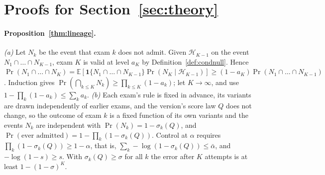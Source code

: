 \section{Proofs for Section~\ref{sec:theory}}\label{app:theory}

\paragraph{Proposition~\ref{thm:lineage}.}
\emph{(a)} Let $N_k$ be the event that exam $k$ does not admit. Given $\mathcal H_{K-1}$ on the event $N_1\cap\dots\cap N_{K-1}$, exam $K$ is valid at level $a_K$ by Definition~\ref{def:condnull}. Hence $\Pr(N_1\cap\dots\cap N_K)=\mathbb E[\mathbf 1\{N_1\cap\dots\cap N_{K-1}\}\Pr(N_K\mid\mathcal H_{K-1})]\ge(1-a_K)\Pr(N_1\cap\dots\cap N_{K-1})$. Induction gives $\Pr(\bigcap_{k\le K}N_k)\ge\prod_{k\le K}(1-a_k)$; let $K\to\infty$, and use $1-\prod_k(1-a_k)\le\sum_ka_k$.
\emph{(b)} Each exam's rule is fixed in advance, its variants are drawn independently of earlier exams, and the version's score law $Q$ does not change, so the outcome of exam $k$ is a fixed function of its own variants and the events $N_k$ are independent with $\Pr(N_k)=1-\sigma_k(Q)$, and $\Pr(\text{ever admitted})=1-\prod_k(1-\sigma_k(Q))$. Control at $\alpha$ requires $\prod_k(1-\sigma_k(Q))\ge1-\alpha$, that is, $\sum_k-\log(1-\sigma_k(Q))\le\bar\alpha$, and $-\log(1-s)\ge s$. With $\sigma_k(Q)\ge\sigma$ for all $k$ the error after $K$ attempts is at least $1-(1-\sigma)^K$.

